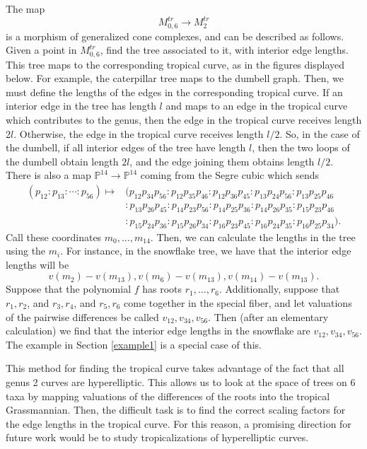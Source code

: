 The map 
$$M_{0,6}^{tr} \rightarrow M_2^{tr}$$
is a morphism of generalized cone complexes, and can be described as follows. Given a point in $M_{0,6}^{tr}$, find the tree associated to it, with interior edge lengths. This tree maps to the corresponding tropical curve, as in the figures displayed below. For example, the caterpillar tree maps to the dumbell graph. Then, we must define the lengths of the edges in the corresponding tropical curve.
 If an interior edge in the tree has length $l$ and maps to an edge in the tropical curve which contributes to the genus,
then the edge in the tropical curve receives length 2$l$. Otherwise, the edge in the tropical curve receives length $l/2$. So, in the case of the dumbell, if all interior edges of the tree have length $l$, then the two loops of the dumbell obtain length $2l$, and the edge joining them obtains length $l/2$.
 \\

There is also a map $\mathbb{P}^{14} \rightarrow \mathbb{P}^{14}$ coming from the Segre cubic which sends
\begin{align*}
(p_{12}: p_{13}: \cdots: p_{56}) \mapsto &(p_{12}p_{34}p_{56}:p_{12}p_{35}p_{46}:p_{12}p_{36}p_{45}:p_{13}p_{24}p_{56}:p_{13}p_{25}p_{46}\\
&:p_{13}p_{26}p_{45}:p_{14}p_{23}p_{56}:p_{14}p_{25}p_{36}:p_{14}p_{26}p_{35}:p_{15}p_{23}p_{46}\\
&:p_{15}p_{24}p_{36}:p_{15}p_{26}p_{34}
:p_{16}p_{23}p_{45}:p_{16}p_{24}p_{35}:p_{16}p_{25}p_{34}).
\end{align*}
Call these coordinates $m_0, \ldots, m_{14}$. Then, we can calculate the lengths in the tree using the $m_i$. For instance, in the snowflake tree, we have that the interior edge lengths will be
$$
v(m_2)-v(m_{13}),v(m_6)-v(m_{13}),v(m_{14})-v(m_{13}).
$$
 Suppose that the polynomial $f$ has roots $r_1, \ldots, r_6$. Additionally, suppose that $r_1,r_2$, and $r_3,r_4$, and $r_5,r_6$ come together in the special fiber, and let valuations of the pairwise differences be called $v_{12},v_{34}, v_{56}$. Then (after an elementary calculation) we find that the interior edge lengths in the snowflake are  $v_{12},v_{34}, v_{56}$. The example in Section \ref{example1} is a special case of this.
 
 This method for finding the tropical curve takes advantage of the fact that all genus 2 curves are hyperelliptic. This allows us to look at the space of trees on 6 taxa by mapping valuations of the differences of the roots into the tropical Grassmannian. Then, the difficult task is to find the correct scaling factors for the edge lengths in the tropical curve. For this reason, a promising direction for future work would be to study tropicalizations of hyperelliptic curves.

